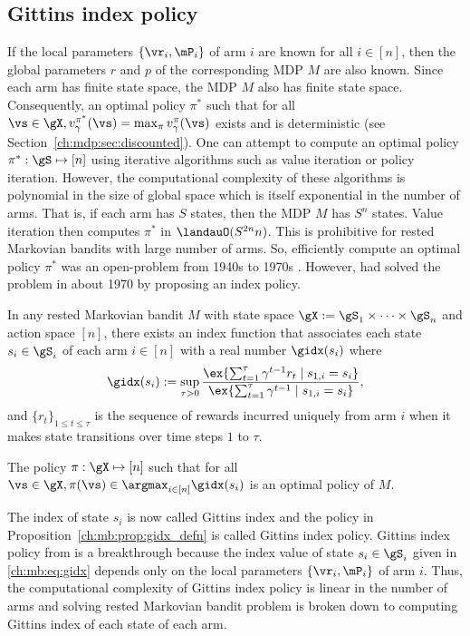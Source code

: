 \subsection{Gittins index policy}
\label{ssec:gittins_idx}

If the local parameters $\{\vr_i,\mP_i\}$ of arm $i$ are known for all $i\in[n]$, then the global parameters $r$ and $p$ of the corresponding MDP $M$ are also known.
Since each arm has finite state space, the MDP $M$ also has finite state space.
Consequently, an optimal policy $\pi^*$ such that for all $\vs\in\gX, v_\gamma^{\pi^*}(\vs)=\max_{\pi}v_\gamma^\pi(\vs)$ exists and is deterministic (see Section~\ref{ch:mdp:sec:discounted}).
One can attempt to compute an optimal policy $\pi^*:\gS\mapsto[n]$ using iterative algorithms such as value iteration or policy iteration.
However, the computational complexity of these algorithms is polynomial in the size of global space which is itself exponential in the number of arms.
That is, if each arm has $S$ states, then the MDP $M$ has $S^n$ states.
Value iteration then computes $\pi^*$ in $\landauO(S^{2n}n)$.
This is prohibitive for rested Markovian bandits with large number of arms.
So, efficiently compute an optimal policy $\pi^*$ was an open-problem from 1940s to 1970s \cite{whittle1996optimal}.
However, \cite{gittins1979bandit} had solved the problem in about 1970 by proposing an index policy.
\begin{prop}
    \label{ch:mb:prop:gidx_defn}
    In any rested Markovian bandit $M$ with state space $\gX:=\gS_1\times\dots\times\gS_n$ and action space $[n]$, there exists an index function that associates each state $s_i\in\gS_i$ of each arm $i\in[n]$ with a real number $\gidx(s_i)$ where
    \begin{equation}
        \label{ch:mb:eq:gidx}
        \gidx(s_i):=\sup_{\tau>0}\frac{\ex{\sum_{t=1}^{\tau}\gamma^{t-1}r_t \mid s_{1,i}=s_i}}{\ex{\sum_{t=1}^{\tau}\gamma^{t-1}\mid s_{1,i}=s_i}}, 
    \end{equation}
    and $\{r_t\}_{1\le t\le\tau}$ is the sequence of rewards incurred uniquely from arm $i$ when it makes state transitions over time steps $1$ to $\tau$.

    The policy $\pi:\gX\mapsto[n]$ such that for all $\vs\in\gX, \pi(\vs)\in\argmax_{i\in[n]}\gidx(s_i)$ is an optimal policy of $M$.
\end{prop}
The index of state $s_i$ is now called Gittins index and the policy in Proposition~\ref{ch:mb:prop:gidx_defn} is called Gittins index policy.
Gittins index policy from \cite{gittins1979bandit} is a breakthrough because the index value of state $s_i\in\gS_i$ given in \eqref{ch:mb:eq:gidx} depends only on the local parameters $\{\vr_i,\mP_i\}$ of arm $i$.
Thus, the computational complexity of Gittins index policy is linear in the number of arms and solving rested Markovian bandit problem is broken down to computing Gittins index of each state of each arm.

